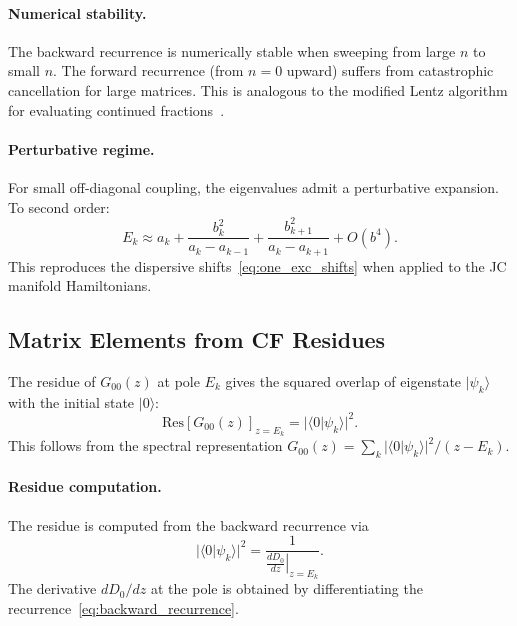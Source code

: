 \documentclass[reprint, floatfix, superscriptaddress, amsmath, amssymb, longbibliography]{revtex4-2}
\begin{document}
\paragraph{Numerical stability.} The backward recurrence is numerically stable when sweeping from large $n$ to small $n$. The forward recurrence (from $n=0$ upward) suffers from catastrophic cancellation for large matrices. This is analogous to the modified Lentz algorithm for evaluating continued fractions~\cite{Press2007}.

\paragraph{Perturbative regime.} For small off-diagonal coupling, the eigenvalues admit a perturbative expansion. To second order:
\begin{equation}
E_k \approx a_k + \frac{b_k^2}{a_k - a_{k-1}} + \frac{b_{k+1}^2}{a_k - a_{k+1}} + O(b^4).
\label{eq:eigenvalue_perturbative}
\end{equation}
This reproduces the dispersive shifts~\eqref{eq:one_exc_shifts} when applied to the JC manifold Hamiltonians.

\subsection{Matrix Elements from CF Residues}
\label{sec:matrix_elements}

The residue of $G_{00}(z)$ at pole $E_k$ gives the squared overlap of eigenstate $|\psi_k\rangle$ with the initial state $|0\rangle$:
\begin{equation}
\mathrm{Res}[G_{00}(z)]_{z=E_k} = |\langle 0|\psi_k\rangle|^2.
\label{eq:residue_overlap}
\end{equation}
This follows from the spectral representation $G_{00}(z) = \sum_k |\langle 0|\psi_k\rangle|^2/(z - E_k)$.

\paragraph{Residue computation.} The residue is computed from the backward recurrence via
\begin{equation}
|\langle 0|\psi_k\rangle|^2 = \frac{1}{\left.\frac{dD_0}{dz}\right|_{z=E_k}}.
\label{eq:residue_derivative}
\end{equation}
The derivative $dD_0/dz$ at the pole is obtained by differentiating the recurrence~\eqref{eq:backward_recurrence}.
\end{document}
